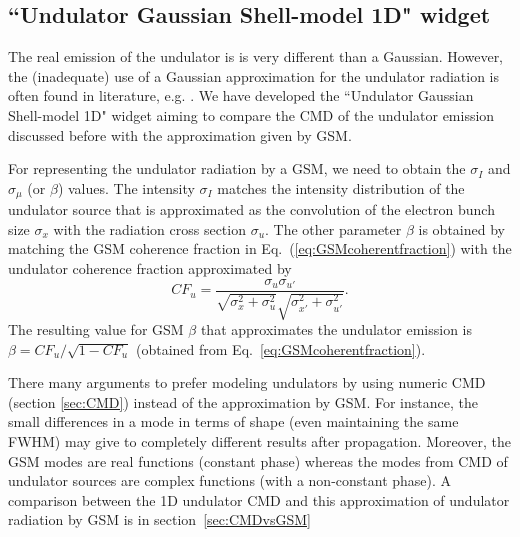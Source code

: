 \documentclass{iopconfser}
\newcommand{\todo}[1]{{\color{red}[TODO: "#1'']}}
\begin{document}
\subsection{``Undulator Gaussian Shell-model 1D" widget}
\label{sec:undulatorGSM}

The real emission of the undulator is is very different than a Gaussian. However, the (inadequate) use of a Gaussian approximation for the undulator radiation is often found in literature, e.g.  \cite{coisson1997}.
We have developed the ``Undulator Gaussian Shell-model 1D" widget
aiming to compare the CMD of the undulator emission discussed before with the approximation given by GSM.

For representing the undulator radiation by a GSM, we need to obtain the $\sigma_I$ and $\sigma_\mu$ (or $\beta$) values. The intensity $\sigma_I$ matches the intensity distribution of the undulator source that is approximated as the convolution of the electron bunch size $\sigma_x$ with the radiation cross section $\sigma_u$. The other parameter $\beta$ is obtained by matching the GSM coherence fraction in Eq.~(\ref{eq:GSMcoherentfraction}) with the undulator coherence fraction approximated by
\begin{equation}\label{eq:CFphasespace}
    CF_u = \frac{\sigma_u\sigma_{u'}}{\sqrt{\sigma_x^2+\sigma_u^2}\sqrt{\sigma_{x'}^2+\sigma_{u'}^2}}.
\end{equation}
The resulting value for GSM $\beta$ that approximates the undulator emission is $\beta=CF_u/\sqrt{1-CF_u}$ (obtained from Eq.~\ref{eq:GSMcoherentfraction}).

There many arguments to prefer modeling undulators by using numeric CMD (section \ref{sec:CMD}) instead of the approximation by GSM. For instance, the small differences in a mode in terms of shape (even maintaining the same FWHM) may give to completely different results after propagation. Moreover, the GSM modes are real functions (constant phase) whereas the modes from CMD of undulator sources are complex functions (with a non-constant phase). A comparison between the 1D undulator CMD and this approximation of  undulator radiation by GSM is in section~\ref{sec:CMDvsGSM}

\end{document}
